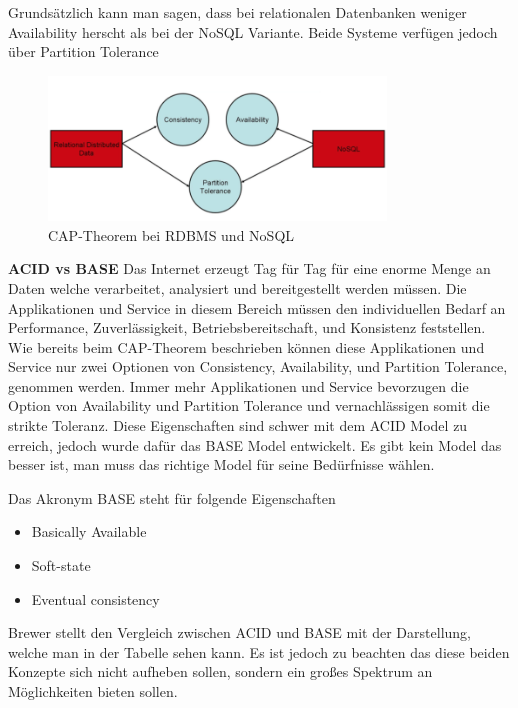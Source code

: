 Grundsätzlich kann man sagen, dass bei relationalen Datenbanken weniger Availability herscht als bei der NoSQL Variante. Beide Systeme verfügen jedoch über Partition Tolerance\cite{MELD.CH2-noSQL.capTheoremComp}

\begin{figure}[!htb]\centering
	\includegraphics[width=0.8\textwidth]{images/capTheorem}
	\caption{CAP-Theorem bei RDBMS und NoSQL\cite{MELD.CH2-noSQL.capTheoremComp}}
\end{figure}

\textbf{ACID vs BASE\newline}
Das Internet erzeugt Tag für Tag für eine enorme Menge an Daten welche verarbeitet, analysiert und bereitgestellt werden müssen. Die Applikationen und Service in diesem Bereich müssen den individuellen Bedarf an Performance, Zuverlässigkeit, Betriebsbereitschaft, und Konsistenz feststellen. Wie bereits beim CAP-Theorem beschrieben können diese Applikationen und Service nur zwei Optionen von Consistency, Availability, und Partition Tolerance, genommen werden. Immer mehr Applikationen und Service bevorzugen die Option von Availability und Partition Tolerance und vernachlässigen somit die strikte Toleranz. Diese Eigenschaften sind schwer mit dem ACID Model zu erreich, jedoch wurde dafür das BASE Model entwickelt. Es gibt kein Model das besser ist, man muss das richtige Model für seine Bedürfnisse wählen.

Das Akronym BASE steht für folgende Eigenschaften
\begin{itemize}
	\item Basically Available
	\item Soft-state
	\item Eventual consistency
\end{itemize}

Brewer stellt den Vergleich zwischen ACID und BASE mit der Darstellung, welche man in der Tabelle sehen kann. Es ist jedoch zu beachten das diese beiden Konzepte sich nicht aufheben sollen, sondern ein großes Spektrum an Möglichkeiten bieten sollen. 

